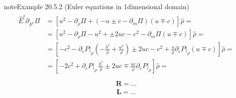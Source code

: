 \documentclass[letterpaper,10pt,english]{jupyterBook}
\begin{document}
\begin{sphinxadmonition}{note}{Example 20.5.2 (Euler equations in 1\sphinxhyphen{}dimensional domain)}
\begin{equation*}
\begin{split}\begin{aligned}
  \hat{E}^t \partial_{E^t} \Pi
  & = \left[  u^2 - \partial_\rho \Pi + ( -u \pm c -\partial_m \Pi ) (u \mp c) \right] \hat{\rho} = \\
  & = \left[  u^2 - \partial_\rho \Pi - u^2 + \pm 2 u c - c^2  -\partial_m \Pi (u \mp c) \right] \hat{\rho} = \\
  & = \left[ - c^2 - \partial_e P \big|_\rho \left( - \frac{h^t}{\rho} + \frac{u^2}{\rho} \right) \pm 2 u c - c^2  + \frac{u}{\rho} \partial_e P \big|_\rho (u \mp c) \right] \hat{\rho} = \\
  & = \left[ - 2 c^2 + \partial_e P \big|_\rho \, \frac{h^t}{\rho} \pm 2 u c  \mp  \frac{u c}{\rho} \partial_e P\big|_\rho \right] \hat{\rho} = \\
\end{aligned}\end{split}
\end{equation*}\begin{equation*}
\begin{split}\mathbf{R} = \dots \end{split}
\end{equation*}\begin{equation*}
\begin{split}\mathbf{L} = \dots \end{split}
\end{equation*}\end{sphinxadmonition}
\label{ch/pde/hyperbolic:example-6}
\end{document}
